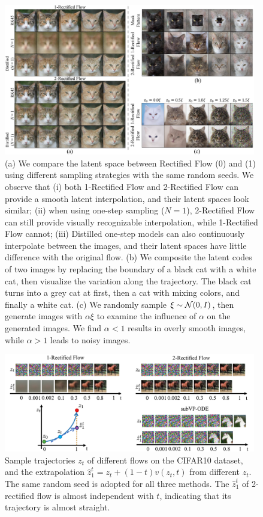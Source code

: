 \begin{figure}
    \centering
    \includegraphics[width=0.98\textwidth]{arxiv_figures/latent_interp_combine.jpeg}
    \caption{
    (a) We compare the latent space between Rectified Flow (0) and (1) using different sampling strategies with the same random seeds. We observe that (i) both 1-Rectified Flow and 2-Rectified Flow can provide a smooth latent interpolation, and their latent spaces look similar; (ii) when using one-step sampling ($N=1$), 2-Rectified Flow can still provide visually recognizable interpolation, while 1-Rectified Flow cannot; (iii) Distilled one-step models can also continuously interpolate between the images, and their latent spaces have little difference with the original flow.
    (b) We composite the latent codes of two images by replacing the boundary of a black cat with a white cat, then visualize the variation along the trajectory. The black cat turns into a grey cat at first, then a cat with mixing colors, and finally a white cat.
    (c) We randomly sample $\xi \sim \mathcal{N}(0, I)$, then generate images with $\alpha \xi$ to examine the influence of $\alpha$ on the generated images. We find $\alpha<1$ results in overly smooth images, while $\alpha > 1$ leads to noisy images. 
    }
    \label{fig:interp_combine}
\end{figure}

\begin{figure}
    \centering
    \includegraphics[width=0.98\textwidth]{arxiv_figures/flow_target_comparison.pdf}
    \caption{
    Sample trajectories $z_t$ of different flows on the CIFAR10 dataset,  %
    and the extrapolation $\hat{z}_1^t =z_t + (1-t) v(z_t, t)$ from different $z_t$. The same random seed is adopted for all three methods. The $\hat z_1^t$ of 2-rectified flow is almost independent with $t$, indicating that its trajectory is almost straight. 
    }
    \label{fig:cifar_target}
\end{figure}



